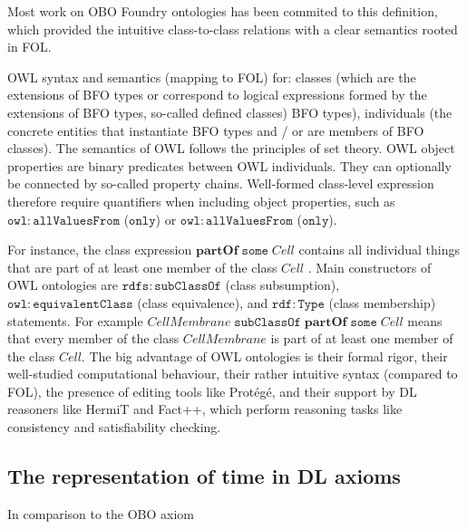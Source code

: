 \documentclass[10pt]{bmc_article}
\newcommand{\mirel}[1]{\ensuremath{\mathrm{\mathbf{#1}}}}
\newcommand{\mclass}[1]{\ensuremath{\mathit{#1}}}
\newenvironment{bmcformat}{\baselineskip20pt\sloppy\setboolean{publ}{false}}{\baselineskip20pt\sloppy}
\begin{document}
\begin{bmcformat}
Most work on OBO Foundry ontologies has been commited to this definition, which provided 
the intuitive class-to-class relations with a clear semantics rooted in FOL. 


OWL syntax and semantics (mapping to FOL) for: classes (which 
are the extensions of BFO types or correspond to logical expressions formed by the extensions of BFO types, so-called defined classes)
BFO types), individuals (the concrete entities that instantiate BFO types and / or are members of BFO classes). 
The semantics of OWL follows the principles of set theory. 
OWL object properties are binary predicates between OWL individuals. They can optionally be connected by so-called property chains. 
Well-formed class-level expression therefore 
require quantifiers when including object properties, such as $\mathtt{owl:allValuesFrom}$ ($\mathtt{only}$) or $\mathtt{owl:allValuesFrom}$ ($\mathtt{only}$).


For instance, the class expression $\mirel{partOf}\;\mathtt{some}\;\mclass{Cell}$ contains all individual things
that are part of at least one member of the class $\mclass{Cell}$ . 
Main constructors of OWL ontologies are $\mathtt{rdfs:subClassOf}$ (class subsumption), 
$\mathtt{owl:equivalentClass}$ (class equivalence), 
and $\mathtt{rdf:Type}$  (class membership) statements. 
For example $\mclass{CellMembrane}\;\mathtt{subClassOf}\;\mirel{partOf}\;\mathtt{some}\;\mclass{Cell}$ 
means that every member of the class $\mclass{CellMembrane}$ is 
part of at least one member of the class $\mclass{Cell}$. 
The big advantage of OWL ontologies is their formal rigor, 
their well-studied computational behaviour, their rather 
intuitive syntax (compared to FOL), the presence of editing tools like Protégé, 
and their support by DL reasoners like HermiT and Fact++, which perform 
reasoning tasks like consistency and satisfiability checking. 

\subsection*{The representation of time in DL axioms}

In comparison to the OBO axiom 


\end{bmcformat}
\end{document}
